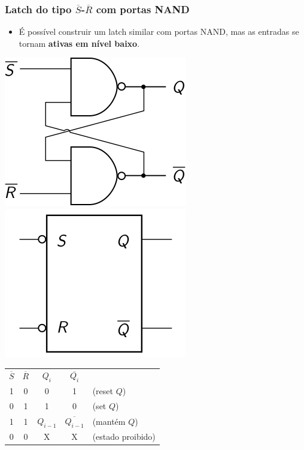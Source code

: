\documentclass{beamer}
\newcommand{\Not}[1]{\overline{#1}}
\begin{document}
\begin{frame}
\frametitle{Latch do tipo $\Not{S}$-$\Not{R}$ com portas NAND}

\begin{itemize}
\item É possível construir um latch similar com portas NAND, mas as
entradas se tornam \textbf{ativas em nível baixo}.
\end{itemize}

\pause

\begin{center}
\includegraphics{images/latchRSnand_circuit}\pause
\hspace{6ex}
\raisebox{40pt}{\Huge$=$}\pause
\hspace{6ex}
\includegraphics{images/latchRSnand_blackbox}\\

\vspace{12pt} \pause

\begin{tabular}{cc||ccl}
$\Not{S}$ & $\Not{R}$ & $Q_i$ & $\Not{Q_i}$ \\
\cline{1-4}
 1  &  0  &   0   &     1       & (reset $Q$) \\
 0  &  1  &   1   &     0       & (set $Q$) \\
 1  &  1  & $Q_{i-1}$ & $\Not{Q_{i-1}}$ & (mantém $Q$) \\
 0  &  0  &   X   &     X       & (estado proibido)
\end{tabular}
\end{center}
\end{frame}
\end{document}
